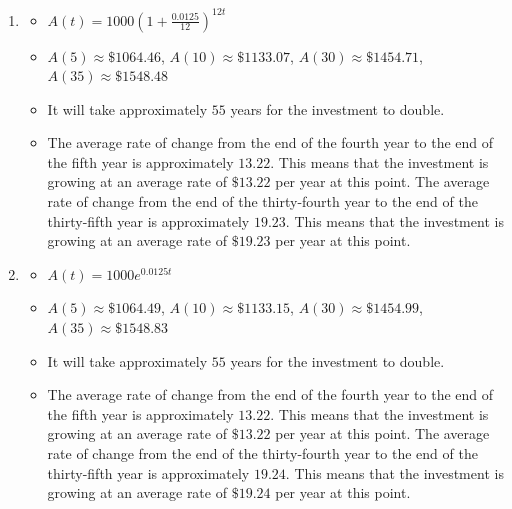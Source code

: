 \documentclass{ximera}
\begin{document}
\begin{enumerate}
\begin{itemize}
\end{itemize}

\item \begin{itemize}  \item $A(t) = 1000\left(1 + \frac{0.0125}{12}\right)^{12t}$ 

\item $A(5) \approx \$ 1064.46$, $A(10) \approx \$ 1133.07$, $A(30) \approx \$ 1454.71$, $A(35) \approx \$ 1548.48$ 

\item  It will take approximately $55$ years for the investment to double.

\item  The average rate of change from the end of the fourth year to the end of the fifth year is approximately $13.22$.  This means that the investment is growing at an average rate of $\$13.22$ per year at this point.  The average rate of change from the end of the thirty-fourth year to the end of the thirty-fifth year is approximately $19.23$.  This means that the investment is growing at an average rate of $\$19.23$ per year at this point. 

\end{itemize}



\item \begin{itemize}  \item $A(t) = 1000e^{0.0125t}$ 

\item $A(5) \approx \$ 1064.49$, $A(10) \approx \$ 1133.15$, $A(30) \approx \$ 1454.99$, $A(35) \approx \$ 1548.83$ 

\item It will take approximately $55$ years for the investment to double.

\item  The average rate of change from the end of the fourth year to the end of the fifth year is approximately $13.22$.  This means that the investment is growing at an average rate of $\$13.22$ per year at this point.  The average rate of change from the end of the thirty-fourth year to the end of the thirty-fifth year is approximately $19.24$.  This means that the investment is growing at an average rate of $\$19.24$ per year at this point. 

\end{itemize}

\pagebreak


\end{enumerate}
\end{document}

